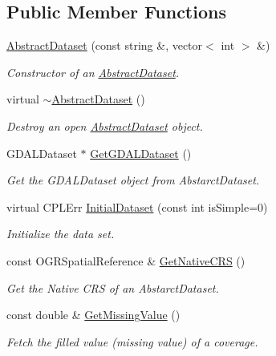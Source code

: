 \subsection*{Public Member Functions}
\begin{DoxyCompactItemize}
\item 
\hyperlink{classAbstractDataset_ad00421fe0b425cdbc26c68c5dc724bee}{AbstractDataset} (const string \&, vector$<$ int $>$ \&)
\begin{DoxyCompactList}\small\item\em Constructor of an \hyperlink{classAbstractDataset}{AbstractDataset}. \end{DoxyCompactList}\item 
virtual \hyperlink{classAbstractDataset_a144cd670169b00b62afbdc2ded2639fa}{$\sim$AbstractDataset} ()
\begin{DoxyCompactList}\small\item\em Destroy an open \hyperlink{classAbstractDataset}{AbstractDataset} object. \end{DoxyCompactList}\item 
GDALDataset $\ast$ \hyperlink{classAbstractDataset_aed8db0cfc46d0171f692364bbf1a7dcf}{GetGDALDataset} ()
\begin{DoxyCompactList}\small\item\em Get the GDALDataset object from AbstarctDataset. \end{DoxyCompactList}\item 
virtual CPLErr \hyperlink{classAbstractDataset_a45924895c6bf26c7f75d503b8f6e388a}{InitialDataset} (const int isSimple=0)
\begin{DoxyCompactList}\small\item\em Initialize the data set. \end{DoxyCompactList}\item 
const OGRSpatialReference \& \hyperlink{classAbstractDataset_a4d92be8700505a6a7ef6655e35b05725}{GetNativeCRS} ()
\begin{DoxyCompactList}\small\item\em Get the Native CRS of an AbstarctDataset. \end{DoxyCompactList}\item 
const double \& \hyperlink{classAbstractDataset_aada8065023ba9b718c0d759698365b40}{GetMissingValue} ()
\begin{DoxyCompactList}\small\item\em Fetch the filled value (missing value) of a coverage. \end{DoxyCompactList}\item 

\end{DoxyCompactItemize}
